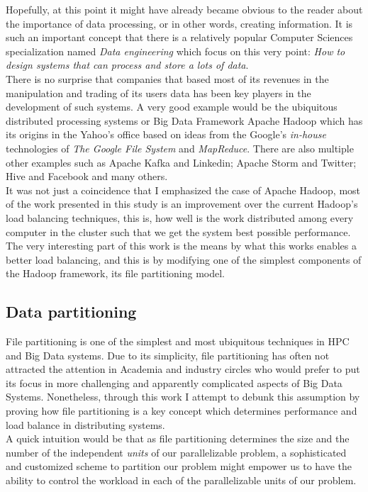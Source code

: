 Hopefully, at this point it might have already became obvious to the reader
about the importance of data processing, or in other words, creating
information. It is such an important concept that there is a relatively popular
Computer Sciences specialization named \textit{Data engineering} which focus on
this very point: \textit{How to design systems that can process and store a lots
of data}. \\

There is no surprise that companies that based most of its revenues in the
manipulation and trading of its users data has been key players in the
development of such systems. A very good example would be the ubiquitous
distributed processing systems or Big Data Framework Apache Hadoop which has its
origins in the Yahoo's office based on ideas from the Google's \textit{in-house}
technologies of \textit{The Google File System} and \textit{MapReduce}\cite{ghemawat2003google}.
There are also multiple other examples such as Apache Kafka and Linkedin; Apache
Storm and Twitter; Hive and Facebook and many others. \\

It was not just a coincidence that I emphasized the case of Apache Hadoop, most
of the work presented in this study is an improvement over the current Hadoop's
load balancing techniques, this is, how well is the work distributed among every
computer in the cluster such that we get the system best possible performance.
The very interesting part of this work is the means by what this works enables a
better load balancing, and this is by modifying one of the simplest
components of the Hadoop framework, its file partitioning model.

\subsection{Data partitioning}

File partitioning is one of the simplest and most ubiquitous techniques in HPC
and Big Data systems. Due to its simplicity, file partitioning has often
not attracted the attention in  Academia and industry circles who would prefer
to put its focus in more challenging and apparently complicated aspects of Big
Data Systems. Nonetheless, through this work I attempt to debunk this assumption
by proving how file partitioning is a key concept which determines performance and
load balance in distributing systems. \\

A quick intuition would be that as file
partitioning determines the size and the number of the independent 
\textit{units} of our parallelizable problem, a sophisticated and customized scheme 
to partition our problem might empower us to have the ability to control the
workload in each of the parallelizable units of our problem. \\

